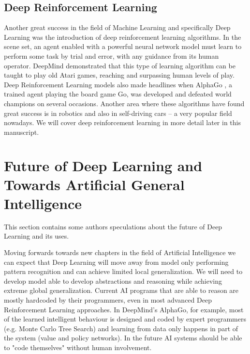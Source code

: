 \documentclass[b5paper]{book}
\let\cite\parencite
\begin{document}
\subsection{Deep Reinforcement Learning}

Another great success in the field of Machine Learning and specifically Deep Learning was the introduction of deep reinforcement learning algorithms. In the scene set, an agent enabled with a powerful neural network model must learn to perform some task by trial and error, with any guidance from its human operator. DeepMind demonstrated that this type of learning algorithm can be taught to play old Atari games, reaching and surpassing human levels of play. \cite{mnih2013playing} Deep Reinforcement Learning models also made headlines when AlphaGo \cite{silver2016mastering}, a trained agent playing the board game Go, was developed and defeated world champions on several occasions. Another area where these algorithms have found great success is in robotics and also in self-driving cars \cite{dosovitskiy2017carla} -- a very popular field nowadays. We will cover deep reinforcement learning in more detail later in this manuscript.

\section{Future of Deep Learning and Towards Artificial General Intelligence}

This section contains some authors speculations about the future of Deep Learning and its uses.

Moving forwards towards new chapters in the field of Artificial Intelligence we can expect that Deep Learning will move away from model only performing pattern recognition and can achieve limited local generalization. We will need to develop model able to develop abstractions and reasoning while achieving extreme global generalization. Current AI programs that are able to reason are mostly hardcoded by their programmers, even in most advanced Deep Reinforcement Learning approaches. In DeepMind's AlphaGo, for example, most of the learned intelligent behaviour is designed and coded by expert programmers (e.g. Monte Carlo Tree Search) and learning from data only happens in part of the system (value and policy networks). In the future AI systems should be able to "code themselves" without human involvement. 
\end{document}
